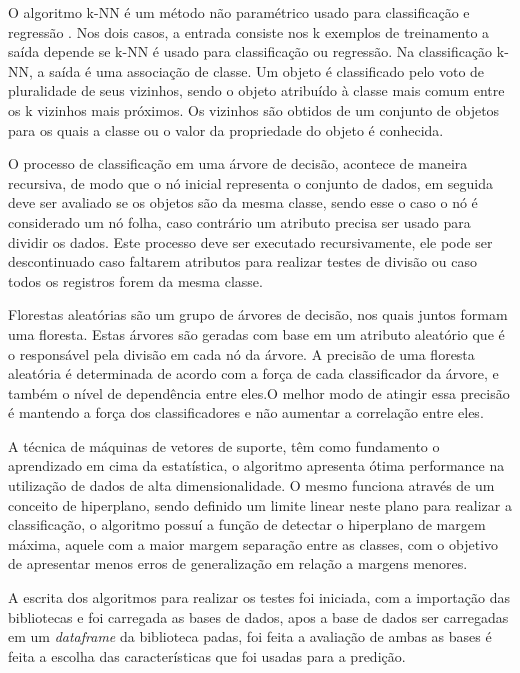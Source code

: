 O algoritmo k-NN é um método não paramétrico usado para classificação e regressão . Nos dois casos, a entrada consiste nos k exemplos de treinamento a saída depende se k-NN é usado para classificação ou regressão. Na classificação k-NN, a saída é uma associação de classe. Um objeto é classificado pelo voto de pluralidade de seus vizinhos, sendo o objeto atribuído à classe mais comum entre os k vizinhos mais próximos. Os vizinhos são obtidos de um conjunto de objetos para os quais a classe ou o valor da propriedade do objeto é conhecida\cite{KamgarParsi1985}.

O processo de classificação em uma árvore de decisão, acontece de maneira recursiva, de modo que o nó inicial representa o conjunto de dados, em seguida deve ser avaliado se os objetos são da mesma classe, sendo esse o caso o nó é considerado um nó folha, caso contrário um atributo precisa ser usado para dividir os dados. Este processo deve ser executado recursivamente, ele pode ser descontinuado caso faltarem atributos para realizar testes de divisão ou caso todos os registros forem da mesma classe\cite{castro}.

Florestas aleatórias são um grupo de árvores de decisão, nos quais juntos formam uma floresta. Estas árvores são geradas com base em um atributo aleatório que é o responsável pela divisão em cada nó da árvore. A precisão de uma floresta aleatória é determinada de acordo com a força de cada classificador da árvore, e também o nível de dependência entre eles.O melhor modo de atingir essa precisão é mantendo a força dos classificadores e não aumentar a correlação entre eles\cite{castro}.

A técnica de máquinas de vetores de suporte, têm como fundamento o aprendizado em cima da estatística, o algoritmo apresenta ótima performance na utilização de dados de alta dimensionalidade. O mesmo funciona através de um conceito de hiperplano, sendo definido um limite linear neste plano para realizar a classificação, o algoritmo possuí a função de detectar o hiperplano de margem máxima, aquele com a maior margem separação entre as classes, com o objetivo de apresentar menos erros de generalização em relação a margens menores\cite{Tan2009}.

A escrita dos algoritmos para realizar os testes foi iniciada, com a importação das bibliotecas e foi carregada as bases de dados, apos a base de dados ser carregadas em um \textit{dataframe} da biblioteca padas, foi feita a avaliação de ambas as bases é feita a escolha das características que foi usadas para a predição.

